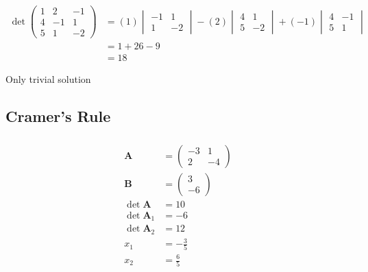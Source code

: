 \documentclass{article}
\begin{document}
\begin{align*}
  \det \begin{pmatrix}
         1 & 2  & -1 \\
         4 & -1 & 1  \\
         5 & 1  & -2
       \end{pmatrix} & = (1) \begin{vmatrix}
                               -1 & 1  \\
                               1  & -2
                             \end{vmatrix} - (2) \begin{vmatrix}
                                                   4 & 1  \\
                                                   5 & -2
                                                 \end{vmatrix} + (-1) \begin{vmatrix}
                                                                        4 & -1 \\
                                                                        5 & 1
                                                                      \end{vmatrix} \\
                       & = 1 + 26 - 9                                                \\
                       & = 18
\end{align*}

Only trivial solution

\subsection{Cramer’s Rule}

\subsubsection{}

\begin{align*}
  \mathbf{A}        & = \begin{pmatrix}
                          -3 & 1  \\
                          2  & -4
                        \end{pmatrix} \\
  \mathbf{B}        & = \begin{pmatrix}
                          3 \\
                          -6
                        \end{pmatrix} \\
  \det \mathbf{A}   & = 10             \\
  \det \mathbf{A}_1 & = -6             \\
  \det \mathbf{A}_2 & = 12             \\
  x_1               & = -\frac{3}{5}   \\
  x_2               & = \frac{6}{5}
\end{align*}
\end{document}
